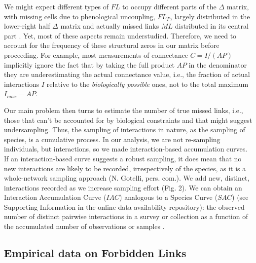 \documentclass[12pt]{article}
\begin{document}
We might expect different types of $FL$ to occupy different parts of the $\Delta$ matrix, with missing cells due to phenological uncoupling, $FL_P$, largely distributed in the lower-right half $\Delta$ matrix and actually missed links $ML$ distributed in its central part \citep{Olesen:2010fi}. Yet, most of these aspects remain understudied. Therefore, we need to account for the frequency of these structural zeros in our matrix before proceeding. For example, most measurements of connectance $C= I/(AP)$ implicitly ignore the fact that by taking the full product $AP$ in the denominator they are underestimating the actual connectance value, i.e., the fraction of actual interactions $I$ relative to the \emph{biologically possible} ones, not to the total maximum $I_{max}= AP$. 

Our main problem then turns to estimate the number of true missed links, i.e., those that can't be accounted for by biological constraints and that might suggest undersampling. Thus, the sampling of interactions in nature, as the sampling of species, is a cumulative process. In our analysis, we are not re-sampling individuals, but interactions, so we made interaction-based accumulation curves. If an interaction-based curve suggests  a robust sampling, it does mean that no new interactions are likely to be recorded, irrespectively of the species, as it is a whole-network sampling approach (N. Gotelli, pers. com.). We add new, distinct, interactions recorded as we increase sampling effort (Fig. 2). We can obtain an Interaction Accumulation Curve ($IAC$) analogous to a Species Curve ($SAC$) (see Supporting Information in the online data availability repository): the observed number of distinct pairwise interactions in a survey or collection as a function of the accumulated number of observations or samples \citep{Colwell:2009gv}. 

\subsection*{Empirical data on Forbidden Links}
\end{document}
